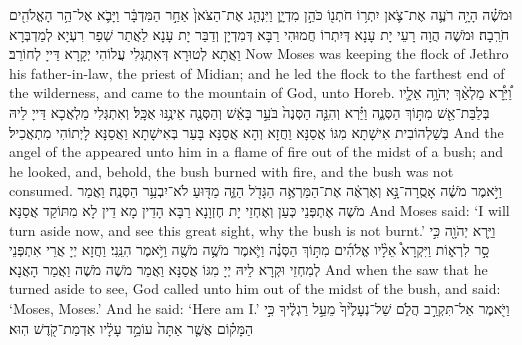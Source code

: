 \newperek
{}%
{וּמֹשֶׁ֗ה הָיָ֥ה רֹעֶ֛ה אֶת־צֹ֛אן יִתְר֥וֹ חֹתְנ֖וֹ כֹּהֵ֣ן מִדְיָ֑ן וַיִּנְהַ֤ג אֶת־הַצֹּאן֙ אַחַ֣ר הַמִּדְבָּ֔ר וַיָּבֹ֛א אֶל־הַ֥ר הָאֱלֹהִ֖ים חֹרֵֽבָה׃
}
{וּמֹשֶׁה הֲוָה רָעֵי יָת עָנָא דְּיִתְרוֹ חֲמוּהִי רַבָּא דְּמִדְיָן וְדַבַּר יָת עָנָא לַאֲתַר שְׁפַר רִעְיָא לְמַדְבְּרָא וַאֲתָא לְטוּרָא דְּאִתְגְּלִי עֲלוֹהִי יְקָרָא דַּייָ לְחוֹרֵב׃}
{Now Moses was keeping the flock of Jethro his father-in-law, the priest of Midian; and he led the flock to the farthest end of the wilderness, and came to the mountain of God, unto Horeb.}{}
{וַ֠יֵּרָ֠א מַלְאַ֨ךְ יְהֹוָ֥ה אֵלָ֛יו בְּלַבַּת־אֵ֖שׁ מִתּ֣וֹךְ הַסְּנֶ֑ה וַיַּ֗רְא וְהִנֵּ֤ה הַסְּנֶה֙ בֹּעֵ֣ר בָּאֵ֔שׁ וְהַסְּנֶ֖ה אֵינֶ֥נּוּ אֻכָּֽל׃
}
{וְאִתְגְּלִי מַלְאֲכָא דַּייָ לֵיהּ בְּשַׁלְהוֹבִית אִישָׁתָא מִגּוֹ אֲסַנָּא וַחֲזָא וְהָא אֲסַנָּא בָּעַר בְּאִישָׁתָא וַאֲסַנָּא לָיְתוֹהִי מִתְאֲכִיל׃}
{And the angel of the \lord\space appeared unto him in a flame of fire out of the midst of a bush; and he looked, and, behold, the bush burned with fire, and the bush was not consumed.}{}
{וַיֹּ֣אמֶר מֹשֶׁ֔ה אָסֻֽרָה־נָּ֣א וְאֶרְאֶ֔ה אֶת־הַמַּרְאֶ֥ה הַגָּדֹ֖ל הַזֶּ֑ה מַדּ֖וּעַ לֹא־יִבְעַ֥ר הַסְּנֶֽה׃
}
{וַאֲמַר מֹשֶׁה אֶתְפְּנֵי כְּעַן וְאֶחְזֵי יָת חֶזְוָנָא רַבָּא הָדֵין מָא דֵין לָא מִתּוֹקַד אֲסַנָּא׃}
{And Moses said: ‘I will turn aside now, and see this great sight, why the bush is not burnt.’}{}
{וַיַּ֥רְא יְהֹוָ֖ה כִּ֣י סָ֣ר לִרְא֑וֹת וַיִּקְרָא֩ אֵלָ֨יו אֱלֹהִ֜ים מִתּ֣וֹךְ הַסְּנֶ֗ה וַיֹּ֛אמֶר מֹשֶׁ֥ה מֹשֶׁ֖ה וַיֹּ֥אמֶר הִנֵּֽנִי׃}
{וַחֲזָא יְיָ אֲרֵי אִתְפְּנֵי לְמִחְזֵי וּקְרָא לֵיהּ יְיָ מִגּוֹ אֲסַנָּא וַאֲמַר מֹשֶׁה מֹשֶׁה וַאֲמַר הָאֲנָא׃}
{And when the \lord\space saw that he turned aside to see, God called unto him out of the midst of the bush, and said: ‘Moses, Moses.’ And he said: ‘Here am I.’}{}
{וַיֹּ֖אמֶר אַל־תִּקְרַ֣ב הֲלֹ֑ם שַׁל־נְעָלֶ֙יךָ֙ מֵעַ֣ל רַגְלֶ֔יךָ כִּ֣י הַמָּק֗וֹם אֲשֶׁ֤ר אַתָּה֙ עוֹמֵ֣ד עָלָ֔יו אַדְמַת־קֹ֖דֶשׁ הֽוּא׃
}
